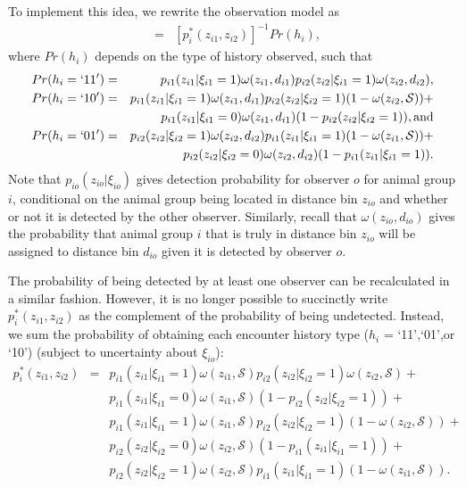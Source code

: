 \documentclass[aoas,preprint]{imsart}
\numberwithin{equation}{section}
\theoremstyle{plain}
\begin{document}
To implement this idea, we rewrite the observation model as
\begin{eqnarray*}
[y_{i1},y_{i2},d_{i1},d_{i2} |z_{i1},z_{i2}, \boldsymbol{\theta} , {\bf x}_i]
& = & [p_i^*(z_{i1},z_{i2})]^{-1} Pr(h_i),
\end{eqnarray*}
where $Pr(h_i)$ depends on the type of history observed, such that
\begin{eqnarray*}
   Pr(h_i = `11') & = &
    p_{i1}(z_{i1}|\xi_{i1}=1) \omega(z_{i1},d_{i1}) p_{i2}(z_{i2}|\xi_{i1}=1) \omega(z_{i2},d_{i2}), \\
   Pr(h_i = `10') & = & p_{i1}(z_{i1}|\xi_{i1}=1)\omega(z_{i1},d_{i1})
    p_{i2}(z_{i2}|\xi_{i2}=1)(1-\omega(z_{i2},\mathcal{S}))+  \\
    & & p_{i1}(z_{i1}|\xi_{i1}=0)\omega(z_{i1},d_{i1})(1-p_{i2}(z_{i2}|\xi_{i2}=1)), \text{and} \\
    Pr(h_i = `01') & = & p_{i2}(z_{i2}|\xi_{i2}=1)\omega(z_{i2},d_{i2})
    p_{i1}(z_{i1}|\xi_{i1}=1)(1-\omega(z_{i1},\mathcal{S}))+ \\
    & & p_{i2}(z_{i2}|\xi_{i2}=0)\omega(z_{i2},d_{i2})(1-p_{i1}(z_{i1}|\xi_{i1}=1)).
\end{eqnarray*}
Note that $p_{io}(z_{io}|\xi_{io})$ gives detection probability for observer $o$ for animal group $i$, conditional on the animal group being located in distance bin $z_{io}$ and whether or not it is detected by the other observer.  Similarly, recall that $\omega(z_{io},d_{io})$ gives the probability that animal group $i$ that is truly in distance bin $z_{io}$ will be assigned to distance bin $d_{io}$ given it is detected by observer $o$.

The probability of being detected by at least one observer can be recalculated in a similar fashion.  However, it is no longer possible to succinctly write $p_i^*(z_{i1},z_{i2})$ as the complement of the probability of being undetected.  Instead, we sum the probability of obtaining each encounter history type ($h_i$ = `11',`01',or `10') (subject to uncertainty about $\xi_{io}$):
\begin{eqnarray*}
  \label{eq:pstar2}
  p_i^*(z_{i1},z_{i2}) & = &
  p_{i1}(z_{i1}|\xi_{i1}=1) \omega(z_{i1},\mathcal{S}) p_{i2}(z_{i2}|\xi_{i2}=1) \omega(z_{i2},\mathcal{S}) + \\
   & & p_{i1}(z_{i1}|\xi_{i1}=0)\omega(z_{i1},\mathcal{S})(1-p_{i2}(z_{i2}|\xi_{i2}=1)) + \nonumber \\ & &
   p_{i1}(z_{i1}|\xi_{i1}=1)\omega(z_{i1},\mathcal{S})p_{i2}(z_{i2}|\xi_{i2}=1)(1-\omega(z_{i2},\mathcal{S}))
   + \nonumber \\ & &
    p_{i2}(z_{i2}|\xi_{i2}=0)\omega(z_{i2},\mathcal{S})(1-p_{i1}(z_{i1}|\xi_{i1}=1)) + \nonumber \\ & &
   p_{i2}(z_{i2}|\xi_{i2}=1)\omega(z_{i2},\mathcal{S})p_{i1}(z_{i1}|\xi_{i1}=1)(1-\omega(z_{i1},\mathcal{S})).
   \nonumber
\end{eqnarray*}
\end{document}

